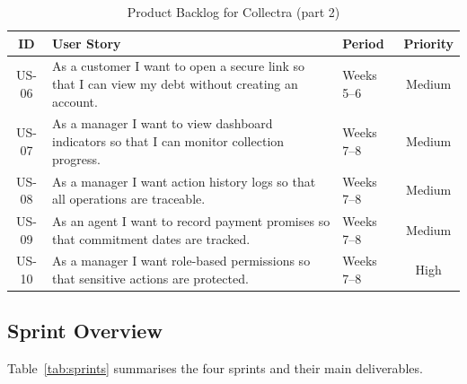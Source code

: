\documentclass[12pt,a4paper]{report}
\newcommand{\reporttablesetup}{%
  \small%
  \setlength{\tabcolsep}{5pt}%
  \renewcommand{\arraystretch}{1.22}%
  \arrayrulecolor{framegray}%
}
\begin{document}
\begin{table}[!htbp]
  \centering
  \reporttablesetup
  \begin{tabularx}{\textwidth}{|c|Y|>{\centering\arraybackslash}p{2.05cm}|c|}
    \hline
    \textbf{ID} & \textbf{User Story} & \textbf{Period} & \textbf{Priority} \\
    \hline
    US-06 & As a customer I want to open a secure link so that I can view my debt
      without creating an account. & Weeks 5--6 & Medium \\
    \hline
    US-07 & As a manager I want to view dashboard indicators so that I can monitor
      collection progress. & Weeks 7--8 & Medium \\
    \hline
    US-08 & As a manager I want action history logs so that all operations are
      traceable. & Weeks 7--8 & Medium \\
    \hline
    US-09 & As an agent I want to record payment promises so that commitment dates
      are tracked. & Weeks 7--8 & Medium \\
    \hline
    US-10 & As a manager I want role-based permissions so that sensitive actions
      are protected. & Weeks 7--8 & High \\
    \hline
  \end{tabularx}
  \caption{Product Backlog for Collectra (part 2)}
  \label{tab:backlog-cont}
\end{table}

\subsection{Sprint Overview}

Table~\ref{tab:sprints} summarises the four sprints and their main deliverables.
\end{document}
